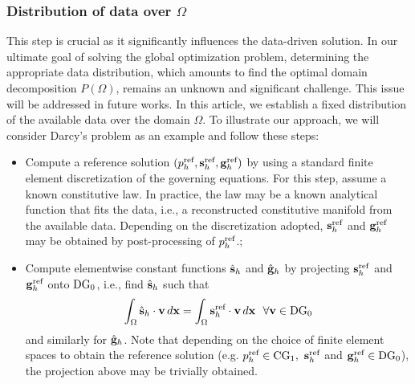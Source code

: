 \subsubsection{Distribution of data over $\Omega$} \label{sec:datadist}

This step is crucial as it significantly influences the data-driven solution. 
In our ultimate goal of solving the global optimization problem, determining
the appropriate data distribution, which amounts to
find the optimal domain decomposition $P(\Omega)$, remains an unknown
and significant challenge. This issue will be addressed in future works.
In this article, we establish a fixed distribution of the available
data over the domain $\Omega$. To illustrate our approach,
we will consider Darcy's problem as an example and follow these steps:

\begin{itemize}
 \item[1.] Compute a reference solution
 $(p_h^{\text{ref}}, \mathbf{s}_h^{\text{ref}}, \mathbf{g}_h^{\text{ref}})$
 by using a standard finite element discretization of the governing
 equations. For this step, assume a known constitutive law. 
 In practice, the law may be a known analytical function that fits the data, i.e.,
 a reconstructed constitutive manifold from the available data.
 Depending on the discretization adopted, $\mathbf{s}_h^{\text{ref}}$ 
 and $\mathbf{g}_h^{\text{ref}}$ may be obtained by post-processing
 of $p_h^{\text{ref}}$.;
 
 \item[2.] Compute elementwise constant functions 
 $\hat{\mathbf{s}}_h$ and $\hat{\mathbf{g}}_h$ 
 by projecting $\mathbf{s}_h^{\text{ref}}$ and $\mathbf{g}_h^{\text{ref}}$
 onto $\text{DG}_0$, i.e., find $\hat{\mathbf{s}}_h$ such that
 $$
\int_{\Omega} \hat{{\mathbf{s}}}_h \cdot {\mathbf{v}} \,{d\mathbf{x}} =
\int_{\Omega} {{\mathbf{s}}}_h^{\text{ref}} \cdot {\mathbf{v}} \,{d\mathbf{x}} ~~\forall {\mathbf{v}} \in \text{DG}_0
 $$
 and similarly for $\hat{\mathbf{g}}_h$. Note that depending on the choice
 of finite element spaces to obtain the reference solution
 (e.g. $p_h^{\text{ref}} \in \text{CG}_1,~\mathbf{s}_h^{\text{ref}}$ and $\mathbf{g}_h^{\text{ref}} \in \text{DG}_0$), 
 the projection above may be trivially obtained.


\end{itemize}
